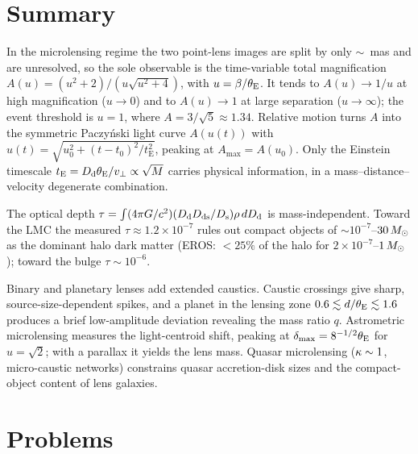 \section{Summary}
\label{sec:micro_summary}

In the microlensing regime the two point-lens images are
split by only $\sim$~mas and are unresolved, so the sole observable
is the time-variable total magnification
$A(u) = (u^2+2)/(u\sqrt{u^2+4})$, with
$u = \beta/\theta_{\mathrm{E}}$.  It tends to $A(u) \to 1/u$ at high magnification
($u\to0$) and to $A(u)\to1$ at large separation ($u\to\infty$); the event
threshold is $u = 1$, where $A = 3/\sqrt{5} \approx 1.34$.  Relative motion
turns $A$ into the symmetric Paczy\'nski light curve $A(u(t))$ with
$u(t) = \sqrt{u_0^2 + (t-t_0)^2/t_{\mathrm{E}}^2}$, peaking at
$A_{\max} = A(u_0)$.  Only the Einstein timescale
$t_{\mathrm{E}} = D_{\mathrm{d}}\theta_{\mathrm{E}}/v_\perp \propto \sqrt{M}$ carries
physical information, in a mass--distance--velocity degenerate
combination.

The optical depth
$\tau = \int (4\pi G/c^2)(D_{\mathrm{d}}D_{\mathrm{ds}}/D_{\mathrm{s}})\rho\,dD_{\mathrm{d}}$
is mass-independent.  Toward the LMC the measured
$\tau \approx 1.2\times10^{-7}$ rules out compact objects of
$\sim\!10^{-7}$--$30\,M_{\odot}$ as the dominant halo dark matter
(EROS: $< 25\%$ of the halo for $2\times10^{-7}$--$1\,M_{\odot}$);
toward the bulge $\tau \sim 10^{-6}$.

Binary and planetary lenses add extended caustics.  Caustic
crossings give sharp, source-size-dependent spikes, and a planet in
the lensing zone $0.6 \lesssim d/\theta_{\mathrm{E}} \lesssim 1.6$ produces a
brief low-amplitude deviation revealing the mass ratio $q$.
Astrometric microlensing measures the light-centroid shift,
peaking at $\delta_{\max} = 8^{-1/2}\theta_{\mathrm{E}}$ for $u = \sqrt2$; with a
parallax it yields the lens mass.  Quasar microlensing ($\kappa\sim1$,
micro-caustic networks) constrains quasar accretion-disk sizes and the
compact-object content of lens galaxies.


\section{Problems}
\label{sec:micro_problems}

